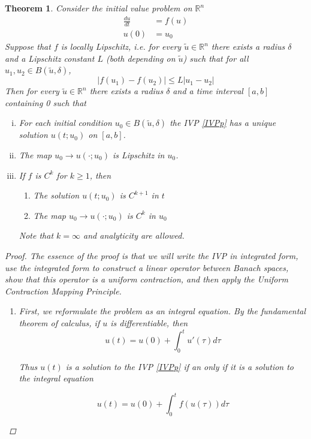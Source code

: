 \documentclass{article}
\newtheorem{theorem}{Theorem}[section]
\def\R{{\mathbb R}}
\begin{document}
\begin{theorem}
Consider the initial value problem on $\R^n$
\begin{align}\label{IVPp}
\frac{du}{dt} &= f(u) \\
u(0) &= u_0 \nonumber
\end{align}
Suppose that $f$ is locally Lipschitz, i.e. for every $\tilde{u} \in \R^n$ there exists a radius $\delta$ and a Lipschitz constant $L$ (both depending on $\tilde{u}$) such that for all $u_1, u_2 \in B(\tilde{u}, \delta)$,
\[
|f(u_1) - f(u_2)| \leq L|u_1 - u_2|
\]
Then for every $\tilde{u} \in \R^n$ there exists a radius $\delta$ and a time interval $[a, b]$ containing 0 such that
\begin{enumerate}[(i)]
\item For each initial condition $u_0 \in B(\tilde{u}, \delta)$ the IVP \eqref{IVPp} has a unique solution $u(t; u_0)$ on $[a, b]$.
\item The map $u_0 \rightarrow u(\cdot; u_0)$ is Lipschitz in $u_0$.
\item If $f$ is $C^k$ for $k \geq 1$, then
\begin{enumerate}
\item The solution $u(t; u_0)$ is $C^{k+1}$ in $t$
\item The map $u_0 \rightarrow u(\cdot; u_0)$ is $C^k$ in $u_0$
\end{enumerate}
Note that $k = \infty$ and analyticity are allowed.
\end{enumerate}
\begin{proof}
The essence of the proof is that we will write the IVP in integrated form, use the integrated form to construct a linear operator between Banach spaces, show that this operator is a uniform contraction, and then apply the Uniform Contraction Mapping Principle.
\begin{enumerate}
\item First, we reformulate the problem as an integral equation. By the fundamental theorem of calculus, if $u$ is differentiable, then
\begin{equation*}
u(t) = u(0) + \int_0^t u'(\tau) d \tau
\end{equation*}

Thus $u(t)$ is a solution to the IVP \eqref{IVPp} if an only if it is a solution to the integral equation

\begin{equation}\label{intform}
u(t) = u(0) + \int_0^t f(u(\tau)) d \tau
\end{equation}


\end{enumerate}
\end{proof}
\end{theorem}
\end{document}
